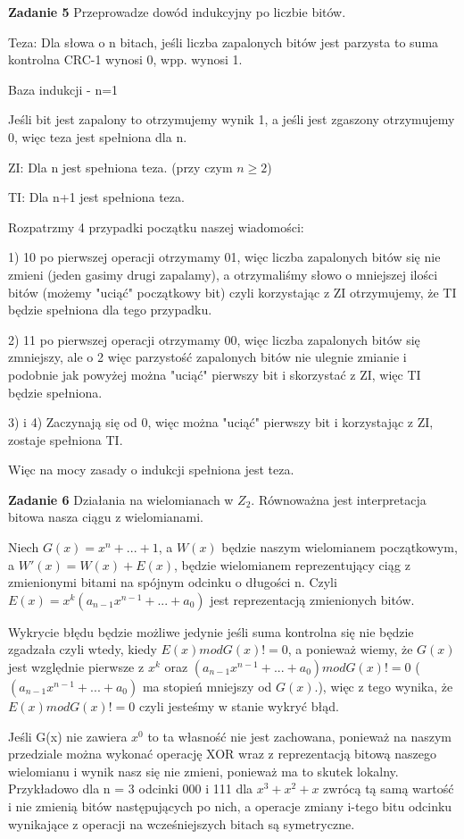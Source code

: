 \documentclass[12pt,a4paper]{article}
\newcommand{\zadanie}[1]{\par\textbf{Zadanie #1}}
\begin{document}
\zadanie{5}
Przeprowadze dowód indukcyjny po liczbie bitów.

Teza: Dla słowa o n bitach, jeśli liczba zapalonych bitów jest parzysta to suma kontrolna CRC-1 wynosi 0, wpp. wynosi 1.

Baza indukcji - n=1

Jeśli bit jest zapalony to otrzymujemy wynik 1, a jeśli jest zgaszony otrzymujemy 0, więc teza jest spełniona dla n.

ZI: Dla n jest spełniona teza. (przy czym $n \geq 2$)

TI: Dla n+1 jest spełniona teza.

Rozpatrzmy 4 przypadki początku naszej wiadomości:

1) 10 po pierwszej operacji otrzymamy 01, więc liczba zapalonych bitów się nie zmieni (jeden gasimy drugi zapalamy), a otrzymaliśmy słowo o mniejszej ilości bitów (możemy "uciąć" początkowy bit) czyli korzystając z ZI otrzymujemy, że TI będzie spełniona dla tego przypadku.

2) 11 po pierwszej operacji otrzymamy 00, więc liczba zapalonych bitów się zmniejszy, ale o 2 więc parzystość zapalonych bitów nie ulegnie zmianie i podobnie jak powyżej można "uciąć" pierwszy bit i skorzystać z ZI, więc TI będzie spełniona.

3) i 4) Zaczynają się od 0, więc można "uciąć" pierwszy bit i korzystając z ZI, zostaje spełniona TI.

Więc na mocy zasady o indukcji spełniona jest teza.

\zadanie{6}
Działania na wielomianach w $Z_2$. Równoważna jest interpretacja bitowa nasza ciągu z wielomianami.

Niech $G(x) = x^n + ... + 1$, a $W(x)$ będzie naszym wielomianem początkowym, a $W'(x) = W(x) + E(x)$, będzie wielomianem reprezentujący ciąg z zmienionymi bitami na spójnym odcinku o długości n. Czyli $E(x)= x^k(a_{n-1}x^{n-1}+...+a_0)$ jest reprezentacją zmienionych bitów.

Wykrycie błędu będzie możliwe jedynie jeśli suma kontrolna się nie będzie zgadzała czyli wtedy, kiedy $E(x) mod G(x) != 0$, a ponieważ wiemy, że $G(x)$ jest względnie pierwsze z $x^k$ oraz $(a_{n-1}x^{n-1}+...+a_0) mod G(x) != 0$ ($(a_{n-1}x^{n-1}+...+a_0)$ ma stopień mniejszy od $G(x)$.), więc z tego wynika, że $E(x) mod G(x) != 0$ czyli jesteśmy w stanie wykryć błąd.

Jeśli G(x) nie zawiera $x^0$ to ta własność nie jest zachowana, ponieważ na naszym przedziale można wykonać operację XOR wraz z reprezentacją bitową naszego wielomianu i wynik nasz się nie zmieni, ponieważ ma to skutek lokalny. Przykładowo dla n = 3 odcinki 000 i 111 dla $x^3+x^2+x$ zwrócą tą samą wartość i nie zmienią bitów następujących po nich, a operacje zmiany i-tego bitu odcinku wynikające z operacji na wcześniejszych bitach są symetryczne.
\end{document}
